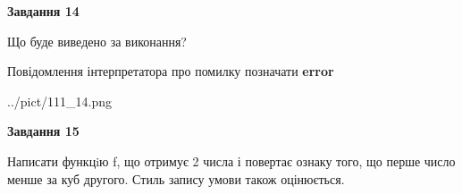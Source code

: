 \documentclass[11pt, ukrainian]{article}
\begin{document}
{\begin {large}
{\begin {center}\textbf{Завдання 14}\end {center}}\par
Що буде виведено за виконання? \par
Повідомлення інтерпретатора про помилку позначати \textbf{error}

\begin{center}
	{../pict/111_14.png}
\end{center}
\newpage

{\begin {center}\textbf{Завдання 15}\end {center}}\par

Написати функцiю f, що отримує 2 числа і повертає ознаку того, що перше число менше за куб другого. Стиль запису умови також оцінюється.\par
\newpage

\end {large}}
\end{document}
